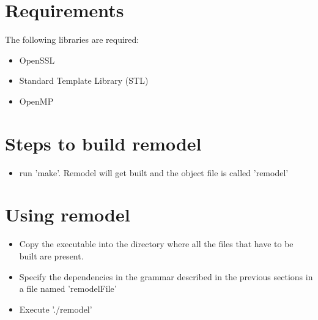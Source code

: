 \documentclass[a4paper, 12pt, notitlepage]{report}
\begin{document}
\section{Requirements}
The following libraries are required:
\begin{itemize}
\item OpenSSL
\item Standard Template Library (STL)
\item OpenMP
\end{itemize}

\section{Steps to build remodel}
\begin{itemize}
\item run 'make'. Remodel will get built and the object file is called 'remodel'
\end{itemize}

\section{Using remodel}
\begin{itemize}
\item Copy the executable into the directory where all the files that have to be built are present.
\item Specify the dependencies in the grammar described in the previous sections in a file named 'remodelFile' 
\item Execute './remodel'
\end{itemize}
\end{document}
